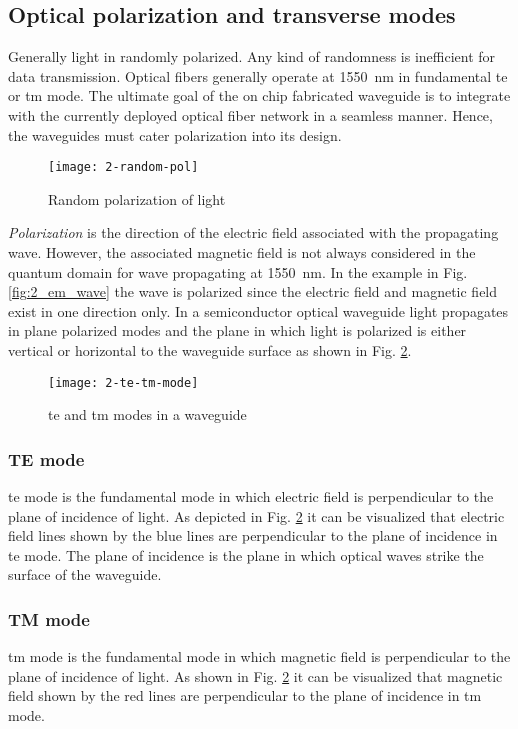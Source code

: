 \documentclass[../report.tex]{subfiles}
\begin{document}
		\subsection{Optical polarization and transverse modes}
Generally light in randomly polarized. Any kind of randomness is inefficient for data transmission. Optical fibers generally operate at \SI{1550}{\nano\metre} in fundamental \gls{te} or \gls{tm} mode. The ultimate goal of the on chip fabricated waveguide is to integrate with the currently deployed optical fiber network in a seamless manner. Hence, the waveguides must cater polarization into its design.  
\begin{figure}[h]
	\centering
	\texttt{[image: 2-random-pol]}
	\caption{Random polarization of light}
	\label{fig:2_random_pol}
\end{figure}
\textit{Polarization} is the direction of the electric field associated with the propagating wave. However, the associated magnetic field is not always considered in the quantum domain for wave propagating at \SI{1550}{\nano\metre}. In the example in Fig. \ref{fig:2_em_wave} the wave is polarized since the electric field and magnetic field exist in one direction only. In a semiconductor optical waveguide light propagates in plane polarized modes and the plane in which light is polarized is either vertical or horizontal to the waveguide surface as shown in Fig. \ref{fig:2_te_tm_mode}. 
\begin{figure}[H]
	\centering
	\texttt{[image: 2-te-tm-mode]}
	\caption{\gls{te} and \gls{tm} modes in a waveguide}
	\label{fig:2_te_tm_mode}
\end{figure}			
			\subsubsection{TE mode}
\gls{te} mode is the fundamental mode in which electric field is perpendicular to the plane of incidence of light. As depicted in Fig. \ref{fig:2_te_tm_mode} it can be visualized that electric field lines shown by the blue lines are perpendicular to the plane of incidence in \gls{te} mode. The plane of incidence is the plane in which optical waves strike the surface of the waveguide.						
			\subsubsection{TM mode}
\gls{tm} mode is the fundamental mode in which magnetic field is perpendicular to the plane of incidence of light. As shown in Fig. \ref{fig:2_te_tm_mode} it can be visualized that magnetic field shown by the red lines are perpendicular to the plane of incidence in \gls{tm} mode.			
\end{document}
